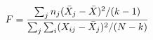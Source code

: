 \documentclass[preview]{standalone}
\begin{document}
\begin{align*}
\special{dvisvgm:raw <g id='unique000'>}F = \frac{\sum_{j} n_j (\bar{X}_j - \bar{X})^2 / (k-1)}{\sum_{j}\sum_{i} (X_{ij} - \bar{X}_j)^2 / (N-k)}\special{dvisvgm:raw </g>}
\end{align*}
\end{document}
